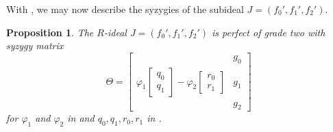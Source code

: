 \documentclass[reqno]{amsart}
\newtheorem{prop}[thm]{Proposition}
\numberwithin{equation}{section}
\theoremstyle{definition}
\begin{document}
With , we may now describe the syzygies of the subideal $J=(f_0',f_1',f_2')$.




\begin{prop}\label{J g2p}
The $R$-ideal $J=(f_0',f_1',f_2')$ is perfect of grade two with syzygy matrix
\begin{equation}\label{HB subideal}
\Theta=\left[
\begin{array}{c|c}
     & g_0  \\
 \varphi_1\begin{bmatrix}
     q_0\\
     q_1
 \end{bmatrix} - \varphi_2\begin{bmatrix}
     r_0\\
     r_1
 \end{bmatrix}    & g_1\\
     &g_2
\end{array}
\right]
\end{equation}
for $\varphi_1$ and $\varphi_2$ in  and $q_0,q_1,r_0,r_1$  in .    
\end{prop}
\end{document}

